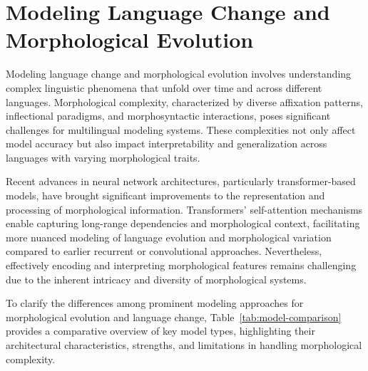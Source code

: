 \documentclass[sigconf]{acmart}
\begin{document}
\section{Modeling Language Change and Morphological Evolution}

Modeling language change and morphological evolution involves understanding complex linguistic phenomena that unfold over time and across different languages. Morphological complexity, characterized by diverse affixation patterns, inflectional paradigms, and morphosyntactic interactions, poses significant challenges for multilingual modeling systems. These complexities not only affect model accuracy but also impact interpretability and generalization across languages with varying morphological traits.

Recent advances in neural network architectures, particularly transformer-based models, have brought significant improvements to the representation and processing of morphological information. Transformers' self-attention mechanisms enable capturing long-range dependencies and morphological context, facilitating more nuanced modeling of language evolution and morphological variation compared to earlier recurrent or convolutional approaches. Nevertheless, effectively encoding and interpreting morphological features remains challenging due to the inherent intricacy and diversity of morphological systems.

To clarify the differences among prominent modeling approaches for morphological evolution and language change, Table~\ref{tab:model-comparison} provides a comparative overview of key model types, highlighting their architectural characteristics, strengths, and limitations in handling morphological complexity.
\end{document}
